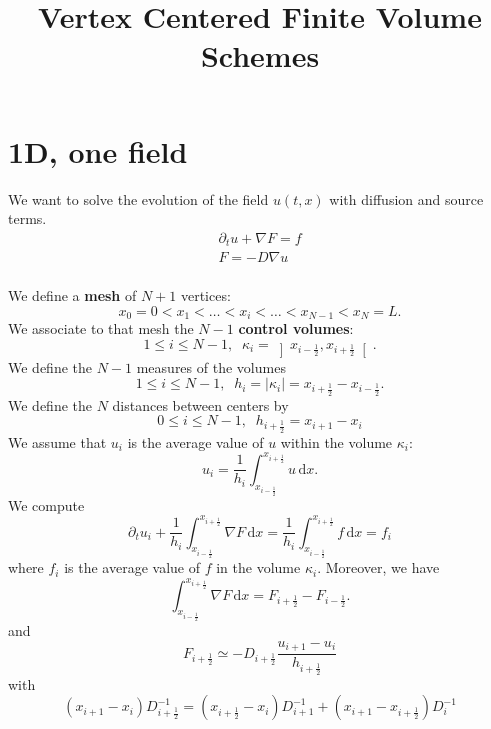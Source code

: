 \documentclass[aps,onecolumn]{revtex4}
\newcommand{\half}{\frac{1}{2}}
\newcommand{\myd}{\,\text{d}}
\begin{document}
\title{Vertex Centered Finite Volume Schemes}

\maketitle

\section{1D, one field}
We want to solve the evolution of the field $u(t,x)$ with diffusion and source terms.
\begin{equation}
	\begin{array}{l}
		\partial_t u + \nabla F = f\\
		F = -D \nabla u\\
	\end{array}
\end{equation}

We define a {\bf mesh} of $N+1$ vertices:
\begin{equation}
x_0=0<x_1<\ldots<x_i<\ldots<x_{N-1}<x_N=L.
\end{equation}
We associate to that mesh the $N-1$ {\bf control volumes}:
\begin{equation}
 1\leq i \leq N-1, \;\; \kappa_{i}=\left\rbrack x_{i-\half}, x_{i+\half}\right\lbrack.
\end{equation}
We define the $N-1$ measures of the volumes
\begin{equation}
 1\leq i \leq N-1, \;\; h_i=\vert \kappa_i \vert=x_{i+\half} - x_{i-\half}.
\end{equation}
We define the $N$ distances between centers by
\begin{equation}
	0\leq i \leq N-1,\;\; h_{i+\half} = x_{i+1} - x_{i}
\end{equation}
We assume that $u_i$ is the average value of $u$ within the volume $\kappa_i$:
\begin{equation}
	u_i = \dfrac{1}{h_i}\int_{x_{i-\half}}^{x_{i+\half}} u\myd x.
\end{equation}
We compute
\begin{equation}
	\partial_t u_i + \dfrac{1}{h_i} \int_{x_{i-\half}}^{x_{i+\half}} \nabla F \myd x = \dfrac{1}{h_i} \int_{x_{i-\half}}^{x_{i+\half}} f \myd x = f_i
\end{equation}
where $f_i$ is the average value of $f$ in the volume $\kappa_i$.
Moreover, we have
\begin{equation}
	\int_{x_{i-\half}}^{x_{i+\half}} \nabla F \myd x = F_{i+\half} - F_{i-\half}.
\end{equation}
and
\begin{equation}
	F_{i+\half} \simeq - D_{i+\half} \dfrac{u_{i+1}-u_{i}}{h_{i+\half}} 
\end{equation}
with 
\begin{equation}
	\left(x_{i+1}-x_{i}\right) D_{i+\half}^{-1} = \left(x_{i+\half}-x_i\right) D_{i+1}^{-1} + \left(x_{i+1} - x_{i+\half}\right) D_{i}^{-1}
\end{equation}
\end{document}
